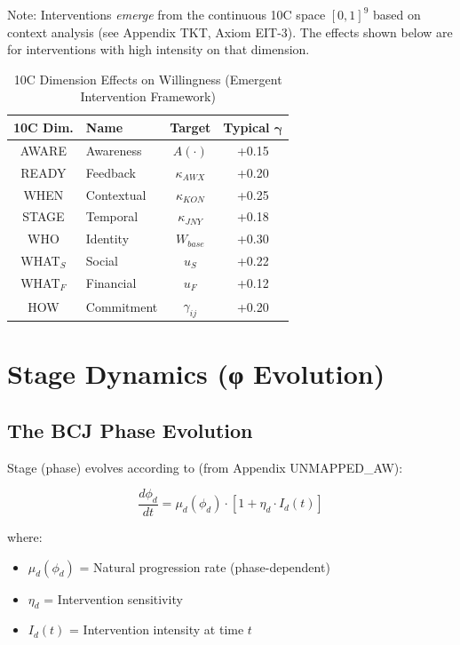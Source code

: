 Note: Interventions \textit{emerge} from the continuous 10C space $[0,1]^9$ based on context analysis (see Appendix TKT, Axiom EIT-3). The effects shown below are for interventions with high intensity on that dimension.

\begin{table}[htbp]
\centering
\caption{10C Dimension Effects on Willingness (Emergent Intervention Framework)}
\label{tab:intervention-effects}
\renewcommand{\arraystretch}{1.3}
\begin{tabular}{@{}clcc@{}}
\toprule
\textbf{10C Dim.} & \textbf{Name} & \textbf{Target} & \textbf{Typical $\boldsymbol{\gamma}$} \\
\midrule
AWARE & Awareness & $A(\cdot)$ & +0.15 \\
READY & Feedback & $\kappa_{AWX}$ & +0.20 \\
WHEN & Contextual & $\kappa_{KON}$ & +0.25 \\
STAGE & Temporal & $\kappa_{JNY}$ & +0.18 \\
WHO & Identity & $W_{base}$ & +0.30 \\
WHAT$_S$ & Social & $u_S$ & +0.22 \\
WHAT$_F$ & Financial & $u_F$ & +0.12 \\
HOW & Commitment & $\gamma_{ij}$ & +0.20 \\
\bottomrule
\end{tabular}
\end{table}


\section{Stage Dynamics (φ Evolution)}
\label{sec:calc-stage}

\subsection{The BCJ Phase Evolution}

Stage (phase) evolves according to (from Appendix UNMAPPED_AW):

\begin{equation}
\boxed{
\frac{d\phi_d}{dt} = \mu_d(\phi_d) \cdot [1 + \eta_d \cdot I_d(t)]
}
\label{eq:phase-ode}
\end{equation}

where:
\begin{itemize}
\item $\mu_d(\phi_d)$ = Natural progression rate (phase-dependent)
\item $\eta_d$ = Intervention sensitivity
\item $I_d(t)$ = Intervention intensity at time $t$
\end{itemize}


